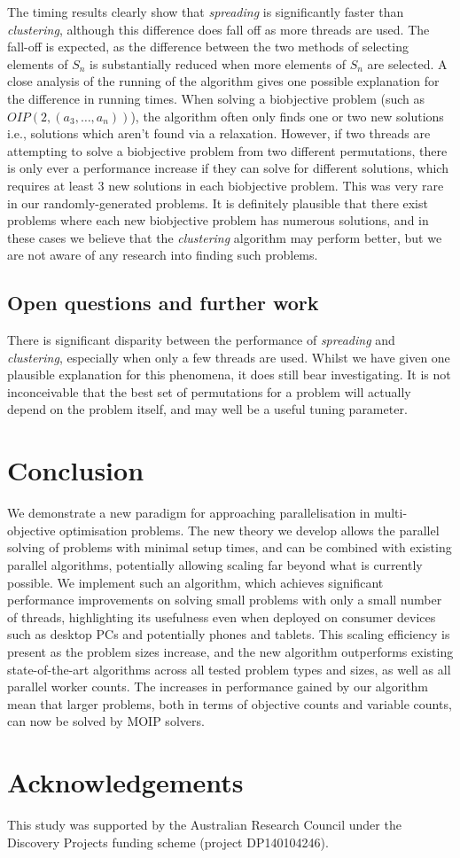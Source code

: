 \documentclass{amsart}
\theoremstyle{definition}
\begin{document}
The timing results clearly show that \emph{spreading} is significantly faster than \emph{clustering}, although this difference does fall off as more threads are used.
The fall-off is expected, as the difference between the two methods of selecting elements of $S_n$ is substantially reduced when more elements of $S_n$ are selected.
A close analysis of the running of the algorithm gives one possible explanation for the difference in running times.
When solving a biobjective problem (such as ${O\!I\!P}(2,(a_3,\dots,a_n))$), the algorithm often only finds one or two new solutions i.e., solutions which aren't found via a relaxation.
However, if two threads are attempting to solve a biobjective problem from two different permutations, there is only ever a performance increase if they can solve for different solutions, which requires at least 3 new solutions in each biobjective problem.
This was very rare in our randomly-generated problems.
It is definitely plausible that there exist problems where each new biobjective problem has numerous solutions, and in these cases we believe that the \emph{clustering} algorithm may perform better, but we are not aware of any research into finding such problems.

\subsection{Open questions and further work}
There is significant disparity between the performance of \emph{spreading} and \emph{clustering}, especially when only a few threads are used.
Whilst we have given one plausible explanation for this phenomena, it does still bear investigating.
It is not inconceivable that the best set of permutations for a problem will actually depend on the problem itself, and may well be a useful tuning parameter.

\section{Conclusion}\label{sec:conclusion}

We demonstrate a new paradigm for approaching parallelisation in multi-objective optimisation problems.
The new theory we develop allows the parallel solving of problems with minimal setup times, and can be combined with existing parallel algorithms, potentially allowing scaling far beyond what is currently possible.
We implement such an algorithm, which achieves significant performance improvements on solving small problems with only a small number of threads, highlighting its usefulness even when deployed on consumer devices such as desktop PCs and potentially phones and tablets.
This scaling efficiency is present as the problem sizes increase, and the new algorithm outperforms existing state-of-the-art algorithms across all tested problem types and sizes, as well as all parallel worker counts.
The increases in performance gained by our algorithm mean that larger problems, both in terms of objective counts and variable counts, can now be solved by MOIP solvers.

\section{Acknowledgements}
This study was supported by the Australian Research Council under the Discovery Projects funding scheme (project DP140104246).



\end{document}
